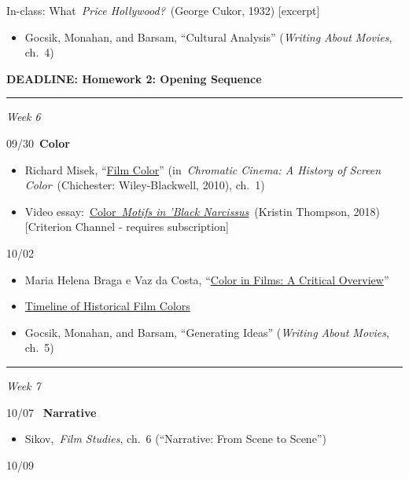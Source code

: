 \documentclass[
  letterpaper,
  DIV=11,
  numbers=noendperiod,
  oneside]{scrartcl}
\providecommand{\tightlist}{%
  \setlength{\itemsep}{0pt}\setlength{\parskip}{0pt}}
\begin{document}
In-class: What~\emph{Price Hollywood?}~(George Cukor, 1932)
{[}excerpt{]}

\begin{itemize}
\tightlist
\item
  Gocsik, Monahan, and Barsam, ``Cultural Analysis'' (\emph{Writing
  About Movies}, ch.~4)
\end{itemize}

\textbf{DEADLINE: Homework 2: Opening Sequence}

\begin{center}\rule{0.5\linewidth}{0.5pt}\end{center}

\emph{Week 6}

09/30~\textbf{Color}

\begin{itemize}
\item
  Richard Misek, ``\href{pdf/Film-Color.pdf}{Film Color}''
  (in~\emph{Chromatic Cinema: A History of Screen Color}~(Chichester:
  Wiley-Blackwell, 2010), ch.~1)
\item
  Video
  essay:~\href{https://www.criterionchannel.com/color-motifs-in-black-narcissus}{Color~\emph{Motifs
  in 'Black Narcissus}}~(Kristin Thompson, 2018) {[}Criterion Channel -
  requires subscription{]}
\end{itemize}

10/02 ~

\begin{itemize}
\item
  Maria Helena Braga e Vaz da Costa,
  ``\href{pdf/Color-in-Films.pdf}{Color in Films: A Critical Overview}''
\item
  \href{https://filmcolors.org/}{Timeline of Historical Film Colors}
\item
  Gocsik, Monahan, and Barsam, ``Generating Ideas'' (\emph{Writing About
  Movies}, ch.~5)
\end{itemize}

\begin{center}\rule{0.5\linewidth}{0.5pt}\end{center}

\emph{Week 7}

10/07 ~\textbf{Narrative}

\begin{itemize}
\tightlist
\item
  Sikov,~\emph{Film Studies}, ch.~6 (``Narrative: From Scene to Scene'')
\end{itemize}

10/09~
\end{document}
